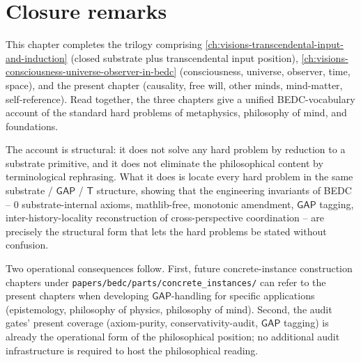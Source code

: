 \section{Closure remarks}
\label{sec:hard-problems-closure}

This chapter completes the trilogy comprising \autoref{ch:visions-transcendental-input-and-induction} (closed substrate plus transcendental input position), \autoref{ch:visions-consciousness-universe-observer-in-bedc} (consciousness, universe, observer, time, space), and the present chapter (causality, free will, other minds, mind-matter, self-reference). Read together, the three chapters give a unified BEDC-vocabulary account of the standard hard problems of metaphysics, philosophy of mind, and foundations.

The account is structural: it does not solve any hard problem by reduction to a substrate primitive, and it does not eliminate the philosophical content by terminological rephrasing. What it does is locate every hard problem in the same substrate / $\mathsf{GAP}$ / $\mathsf{T}$ structure, showing that the engineering invariants of BEDC -- 0 substrate-internal axioms, mathlib-free, monotonic amendment, $\mathsf{GAP}$ tagging, inter-history-locality reconstruction of cross-perspective coordination -- are precisely the structural form that lets the hard problems be stated without confusion.

Two operational consequences follow. First, future concrete-instance construction chapters under \texttt{papers/bedc/parts/concrete\_instances/} can refer to the present chapters when developing $\mathsf{GAP}$-handling for specific applications (epistemology, philosophy of physics, philosophy of mind). Second, the audit gates' present coverage (axiom-purity, conservativity-audit, $\mathsf{GAP}$ tagging) is already the operational form of the philosophical position; no additional audit infrastructure is required to host the philosophical reading.
